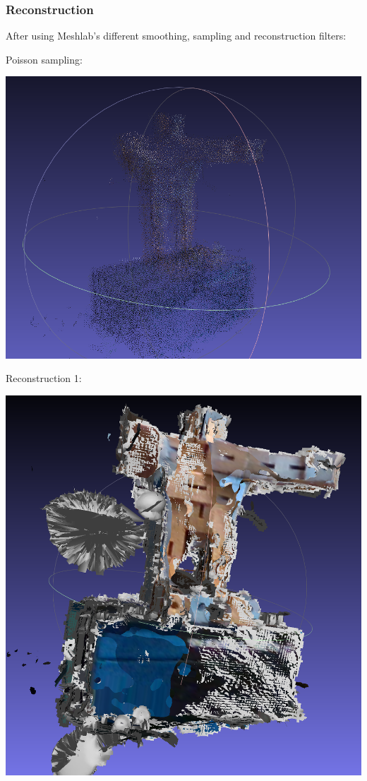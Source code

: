 \begin{frame}[allowframebreaks]
  \frametitle{Reconstruction}

After using Meshlab's different smoothing, sampling and reconstruction filters:

Poisson sampling:
\begin{center}
\includegraphics[scale=0.15]{img/cube_man_poisson_sampling.PNG}
\end{center}

\framebreak

Reconstruction 1:
\begin{center}
\includegraphics[scale=0.15]{img/cube_man_reconstruction1.PNG}
\end{center}


\end{frame}
